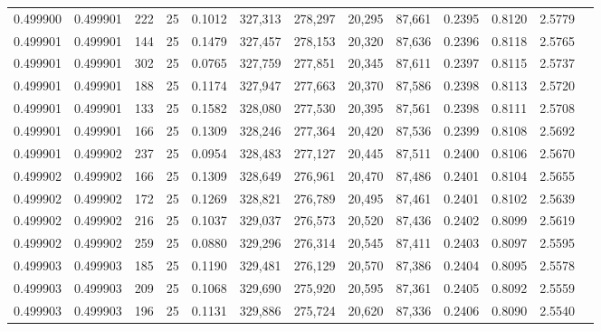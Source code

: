 \begin{tabular}{rrrrrrrrrrrrr}
0.499900 & 0.499901 &   222 &  25 &                                     0.1012 & 327,313 & 278,297 &  20,295 &  87,661 & 0.2395 & 0.8120 & 2.5779 \\
0.499901 & 0.499901 &   144 &  25 &                                     0.1479 & 327,457 & 278,153 &  20,320 &  87,636 & 0.2396 & 0.8118 & 2.5765 \\
0.499901 & 0.499901 &   302 &  25 &                                     0.0765 & 327,759 & 277,851 &  20,345 &  87,611 & 0.2397 & 0.8115 & 2.5737 \\
0.499901 & 0.499901 &   188 &  25 &                                     0.1174 & 327,947 & 277,663 &  20,370 &  87,586 & 0.2398 & 0.8113 & 2.5720 \\
0.499901 & 0.499901 &   133 &  25 &                                     0.1582 & 328,080 & 277,530 &  20,395 &  87,561 & 0.2398 & 0.8111 & 2.5708 \\
0.499901 & 0.499901 &   166 &  25 &                                     0.1309 & 328,246 & 277,364 &  20,420 &  87,536 & 0.2399 & 0.8108 & 2.5692 \\
0.499901 & 0.499902 &   237 &  25 &                                     0.0954 & 328,483 & 277,127 &  20,445 &  87,511 & 0.2400 & 0.8106 & 2.5670 \\
0.499902 & 0.499902 &   166 &  25 &                                     0.1309 & 328,649 & 276,961 &  20,470 &  87,486 & 0.2401 & 0.8104 & 2.5655 \\
0.499902 & 0.499902 &   172 &  25 &                                     0.1269 & 328,821 & 276,789 &  20,495 &  87,461 & 0.2401 & 0.8102 & 2.5639 \\
0.499902 & 0.499902 &   216 &  25 &                                     0.1037 & 329,037 & 276,573 &  20,520 &  87,436 & 0.2402 & 0.8099 & 2.5619 \\
0.499902 & 0.499902 &   259 &  25 &                                     0.0880 & 329,296 & 276,314 &  20,545 &  87,411 & 0.2403 & 0.8097 & 2.5595 \\
0.499903 & 0.499903 &   185 &  25 &                                     0.1190 & 329,481 & 276,129 &  20,570 &  87,386 & 0.2404 & 0.8095 & 2.5578 \\
0.499903 & 0.499903 &   209 &  25 &                                     0.1068 & 329,690 & 275,920 &  20,595 &  87,361 & 0.2405 & 0.8092 & 2.5559 \\
0.499903 & 0.499903 &   196 &  25 &                                     0.1131 & 329,886 & 275,724 &  20,620 &  87,336 & 0.2406 & 0.8090 & 2.5540 \\

\end{tabular}
